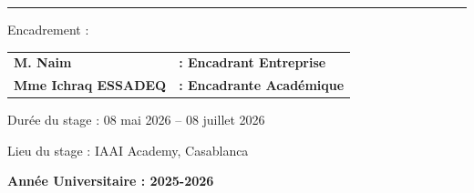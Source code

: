 \documentclass[12pt, a4paper]{report}
\begin{document}
\begin{titlepage}
  \vspace{0.5cm}
  
  \noindent\rule{\textwidth}{0.6pt}
  
  \vspace{1.5cm}
  
  \begin{flushleft}
    {\normalsize Encadrement :}
    
    \vspace{0.5cm}
    
    \begin{tabular}{ll}
      \textbf{M. Naim {\hspace{4cm}}} & \textbf{: Encadrant Entreprise} \\[0.5cm]
      \textbf{Mme Ichraq ESSADEQ\hspace{1cm}} & \textbf{: Encadrante Académique} \\
    \end{tabular}
    
    \vspace{1cm}
    
    {\normalsize Durée du stage : 08 mai 2026 -- 08 juillet 2026}
    
    \vspace{0.5cm}
    
    {\normalsize Lieu du stage : IAAI Academy, Casablanca}
  \end{flushleft}
  
  \vfill
  
  {\large\bfseries\textcolor{iaaiblue}{Année Universitaire : 2025-2026}}
  
  \vspace{1cm}
  
\end{titlepage}
\end{document}
